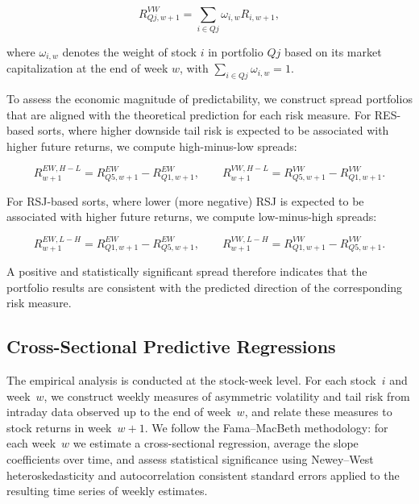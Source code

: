 \documentclass[11pt,a4paper]{article}
\begin{document}
\begin{equation}
R^{VW}_{Qj,w+1}
=
\sum_{i \in Qj} \omega_{i,w} R_{i,w+1},
\label{eq:vw_return}
\end{equation}

where \(\omega_{i,w}\) denotes the weight of stock \(i\) in portfolio
\(Qj\) based on its market capitalization at the end of week \(w\), with
\(\sum_{i \in Qj} \omega_{i,w} = 1\).

To assess the economic magnitude of predictability, we construct spread
portfolios that are aligned with the theoretical prediction for each risk
measure. For RES-based sorts, where higher downside tail risk is expected
to be associated with higher future returns, we compute high-minus-low
spreads:

\begin{equation}
R^{EW,H-L}_{w+1} = R^{EW}_{Q5,w+1} - R^{EW}_{Q1,w+1},
\qquad
R^{VW,H-L}_{w+1} = R^{VW}_{Q5,w+1} - R^{VW}_{Q1,w+1}.
\label{eq:spread_hml}
\end{equation}

For RSJ-based sorts, where lower (more negative) RSJ is expected to be
associated with higher future returns, we compute low-minus-high spreads:

\begin{equation}
R^{EW,L-H}_{w+1} = R^{EW}_{Q1,w+1} - R^{EW}_{Q5,w+1},
\qquad
R^{VW,L-H}_{w+1} = R^{VW}_{Q1,w+1} - R^{VW}_{Q5,w+1}.
\label{eq:spread_lmh}
\end{equation}

A positive and statistically significant spread therefore indicates that
the portfolio results are consistent with the predicted direction of the
corresponding risk measure.


\subsection{Cross-Sectional Predictive Regressions}

The empirical analysis is conducted at the stock-week level. For each
stock~$i$ and week~$w$, we construct weekly measures of asymmetric
volatility and tail risk from intraday data observed up to the end of
week~$w$, and relate these measures to stock returns in week~$w+1$.
We follow the Fama--MacBeth methodology: for each week~$w$ we estimate
a cross-sectional regression, average the slope coefficients over time,
and assess statistical significance using Newey--West heteroskedasticity
and autocorrelation consistent standard errors applied to the resulting
time series of weekly estimates.
\end{document}
